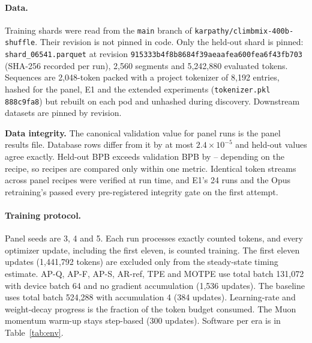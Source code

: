 \documentclass{article}
\newif\ifshowhumanmarkers \showhumanmarkersfalse
\newcommand{\humantag}[1]{{\color{humanframe}\sffamily\scriptsize\bfseries HUMAN AUTHOR MUST REWRITE/VERIFY [#1]}\ }
\newcommand{\humanauthor}[2][]{\ifshowhumanmarkers\begin{humanbox}\humantag{#1}#2\end{humanbox}\else #2\par\fi}
\begin{document}
\paragraph{Data.} Training shards were read from the \texttt{main} branch of \texttt{karpathy/climbmix-400b-shuffle}. Their revision is not pinned in code. Only the held-out shard is pinned: \texttt{shard\_06541.parquet} at revision \texttt{915333b4f8b8684f39aeaafea600fea6f43fb703} (SHA-256 recorded per run), 2,560 segments and 5,242,880 evaluated tokens. Sequences are 2,048-token packed with a project tokenizer of 8,192 entries, hashed for the panel, E1 and the extended experiments (\texttt{tokenizer.pkl} \texttt{888c9fa8}) but rebuilt on each pod and unhashed during discovery. Downstream datasets are pinned by revision.

\humanauthor[P2-11]{\textbf{Data integrity.} The canonical validation value for panel runs is the panel results file. Database rows differ from it by at most $2.4\times10^{-5}$ and held-out values agree exactly. Held-out BPB exceeds validation BPB by \CRHeldValOffLo--\CRHeldValOffHi{} depending on the recipe, so recipes are compared only within one metric. Identical token streams across panel recipes were verified at run time, and E1's 24 runs and the Opus retraining's \CRMTRuns{} passed every pre-registered integrity gate on the first attempt.}

\paragraph{Training protocol.} Panel seeds are 3, 4 and 5. Each run processes exactly \CRPanelBudget{} counted tokens, and every optimizer update, including the first eleven, is counted training. The first eleven updates (1,441,792 tokens) are excluded only from the steady-state timing estimate. AP-Q, AP-F, AP-S, AR-ref, TPE and MOTPE use total batch 131,072 with device batch 64 and no gradient accumulation (1,536 updates). The baseline uses total batch 524,288 with accumulation 4 (384 updates). Learning-rate and weight-decay progress is the fraction of the token budget consumed. The Muon \citep{jordan2024muon} momentum warm-up stays step-based (300 updates). Software per era is in Table~\ref{tab:env}.
\end{document}
